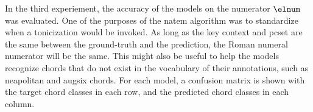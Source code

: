
In the third experiement, the accuracy of the models on the
numerator $\elnum$ was evaluated. One of the purposes of the
\gls{natem} algorithm was to standardize when a tonicization
would be invoked. As long as the key context and \gls{pcset}
are the same between the ground-truth and the prediction,
the Roman numeral numerator will be the same. This might
also be useful to help the models recognize chords that do
not exist in the vocabulary of their annotations, such as
\gls{neapolitan} and \gls{augsix} chords. For each model, a
confusion matrix is shown with the target chord classes in
each row, and the predicted chord classes in each column.
